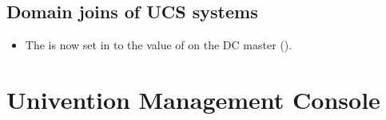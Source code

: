 \subsection{Domain joins of UCS systems}
\begin{itemize}

\item The  is now set in  to
the value of  on the DC master ().

\end{itemize}


\section{Univention Management Console}

